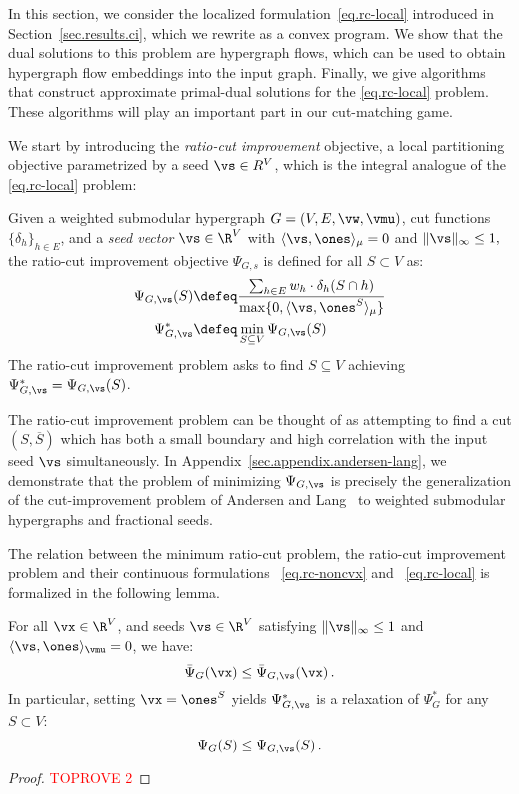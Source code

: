 \documentclass[letterpaper]{article}
\begin{document}
In this section, we consider the localized formulation~\eqref{eq.rc-local} introduced in Section~\ref{sec.results.ci}, which we rewrite as a convex program. We show that the dual solutions to this problem are hypergraph flows, which can be used to obtain hypergraph flow embeddings into the input graph. Finally, we give algorithms that construct approximate primal-dual solutions for the \eqref{eq.rc-local} problem. These algorithms will play an important part in our cut-matching game.

We start by introducing the \emph{ratio-cut improvement} objective, a local partitioning objective parametrized by a seed $\vs \in R^V$, which is the integral analogue of the \eqref{eq.rc-local} problem:
\begin{definition}
\label{def.rc-improve}
Given a weighted submodular hypergraph $G = (V, E, \vw, \vmu)$, cut functions $\{ \delta_h \}_{h \in E}$, and a \emph{seed vector} $\vs \in \R^V$ with $\langle \vs, \ones \rangle_\mu = 0$ and $\lVert \vs \rVert_\infty \leq 1,$ the ratio-cut improvement objective $\Psi_{G,s}$ is defined for all $S \subset V$ as:
\begin{align*}
\Psi_{G, \vs}(S)
&
\defeq
\frac{\sum_{h \in E} w_{h} \cdot \delta_h(S\cap h)} {\max\{0,\langle \vs, \ones^S \rangle_{\mu}\}} \\
\Psi^*_{G, \vs}
&\defeq \min_{S \subseteq V} \Psi_{G, \vs}(S)
\end{align*}
The ratio-cut improvement problem asks to find $S \subseteq V$ achieving $\Psi^*_{G, \vs} = \Psi_{G, \vs}(S)$.
\end{definition}

The ratio-cut improvement problem can be thought of as attempting to find a cut $(S,\overline{S})$ which has both a small boundary and high correlation with the input seed $\vs$ simultaneously. In Appendix~\ref{sec.appendix.andersen-lang}, we demonstrate that the problem of minimizing $\Psi_{G,\vs}$ is precisely the generalization of the cut-improvement problem of Andersen and Lang~\cite{Andersen-Lang} to weighted submodular hypergraphs and fractional seeds.

The relation between the minimum ratio-cut problem, the ratio-cut improvement problem and their continuous formulations ~\eqref{eq.rc-noncvx} and ~\eqref{eq.rc-local} is formalized in the following lemma.

\begin{lemma}
\label{lem.rc-improve.relaxation}
For all $\vx \in \R^V$, and seeds $\vs \in \R^V$ satisfying $\lVert \vs \rVert_{\infty} \leq 1$ and $\langle \vs, \ones \rangle_{\vmu} = 0$, we have:
\begin{equation*}
\bar{\Psi}_G(\vx) \leq \bar{\Psi}_{G, \vs}(\vx) \, .
\end{equation*}
In particular, setting $\vx = \ones^S$ yields $\Psi_{G, \vs}^*$ is a relaxation of $\Psi_G^*$ for any $S \subset V$:
\begin{equation*}
\Psi_G(S) \leq \Psi_{G,\vs}(S) \, .
\end{equation*}
\end{lemma}
\begin{proof}\textcolor{red}{TOPROVE 2}\end{proof}
\end{document}
